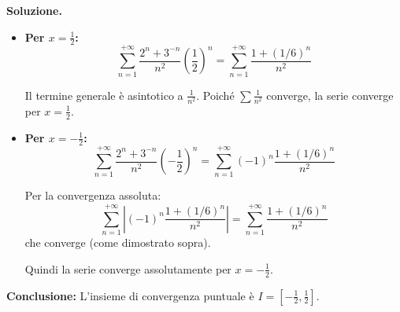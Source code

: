 \documentclass[12pt, a4paper]{article}
\newenvironment{solution}{%
    \par\noindent\textbf{Soluzione.}\medskip\par
    \normalfont
}{\par\bigskip}
\begin{document}
\begin{solution}
\begin{enumerate}
    \begin{itemize}
        \item \textbf{Per $x = \frac{1}{2}$:}
        \[\sum_{n=1}^{+\infty} \frac{2^{n}+3^{-n}}{n^{2}} \left(\frac{1}{2}\right)^n = \sum_{n=1}^{+\infty} \frac{1+(1/6)^n}{n^2}\]
        
        Il termine generale è asintotico a $\frac{1}{n^2}$. Poiché $\sum \frac{1}{n^2}$ converge, la serie converge per $x = \frac{1}{2}$.
        
        \item \textbf{Per $x = -\frac{1}{2}$:}
        \[\sum_{n=1}^{+\infty} \frac{2^{n}+3^{-n}}{n^{2}} \left(-\frac{1}{2}\right)^n = \sum_{n=1}^{+\infty} (-1)^n \frac{1+(1/6)^n}{n^2}\]
        
        Per la convergenza assoluta:
        \[\sum_{n=1}^{+\infty} \left|(-1)^n \frac{1+(1/6)^n}{n^2}\right| = \sum_{n=1}^{+\infty} \frac{1+(1/6)^n}{n^2}\]
        che converge (come dimostrato sopra).
        
        Quindi la serie converge assolutamente per $x = -\frac{1}{2}$.
    \end{itemize}
    
    \textbf{Conclusione:} L'insieme di convergenza puntuale è $I = \left[-\frac{1}{2}, \frac{1}{2}\right]$.
\end{enumerate}
\end{solution}
\end{document}

